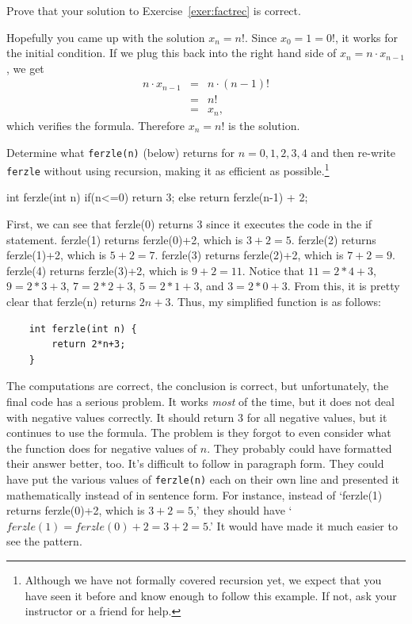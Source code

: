 \begin{exer}
Prove that your solution to Exercise~\ref{exer:factrec} is correct.

\vspace*{2.5in}
\begin{answer}
Hopefully you came up with the solution $x_n=n!$.  
Since $x_0=1=0!$, it works for the initial condition.
If we plug this back into the
right hand side of $x_n=n\cdot x_{n-1}$,  we get
\begin{eqnarray*}
n\cdot x_{n-1}&=&n\cdot (n-1)!\\
&=&n!\\
&=&x_n,
\end{eqnarray*}
which verifies the formula.  Therefore $x_n=n!$ is the solution.
\end{answer}
\end{exer}

\newpage
\begin{eval}\label{eval:ferzle}
Determine what \verb+ferzle(n)+ (below) returns for $n=0, 1, 2, 3, 4$
and then re-write \verb+ferzle+ without using recursion, making it 
as efficient as possible.\footnote{Although we have
not formally covered recursion yet, we expect that you have seen it before and
know enough to follow this example. If not, ask your instructor or a friend for help.}
\begin{code}
	int ferzle(int n) {
	    if(n<=0) {
	        return 3;
	    } else {
	        return ferzle(n-1) + 2;
	    }
	}
\end{code}
\begin{ssol}
First, we can see that ferzle(0) returns 3 since it executes the code in the if statement.
ferzle(1) returns ferzle(0)+2, which is $3+2=5$.
ferzle(2) returns ferzle(1)+2, which is $5+2=7$.
ferzle(3) returns ferzle(2)+2, which is $7+2=9$.
ferzle(4) returns ferzle(3)+2, which is $9+2=11$.
Notice that $11=2*4+3$, $9=2*3+3$, $7=2*2+3$, $5=2*1+3$, and $3=2*0+3$.
From this, it is pretty clear that ferzle(n) returns $2n+3$.
Thus, my simplified function is as follows:
\begin{verbatim}
    int ferzle(int n) {
        return 2*n+3;
    }
\end{verbatim}
\end{ssol}
\evallinethree
\begin{answer}
The computations are correct, the conclusion is correct, but unfortunately,
the final code has a serious problem.  It works {\em most} of the time,
but it does not deal with negative values correctly.  
It should return $3$ for all negative
values, but it continues to use the formula.
The problem is they forgot to even consider what the function does for negative values of $n$.
They probably could have formatted their answer better, too.  It's difficult to follow in paragraph
form.  They could have put the various values of \verb+ferzle(n)+ each on their own line
and presented it mathematically instead of in sentence form.
For instance, instead of `ferzle(1) returns ferzle(0)+2, which is $3+2=5$,'
they should have `$ferzle(1)=ferzle(0)+2=3+2=5$.'
It would have made it much easier to see the pattern.
\end{answer}
\end{eval}

